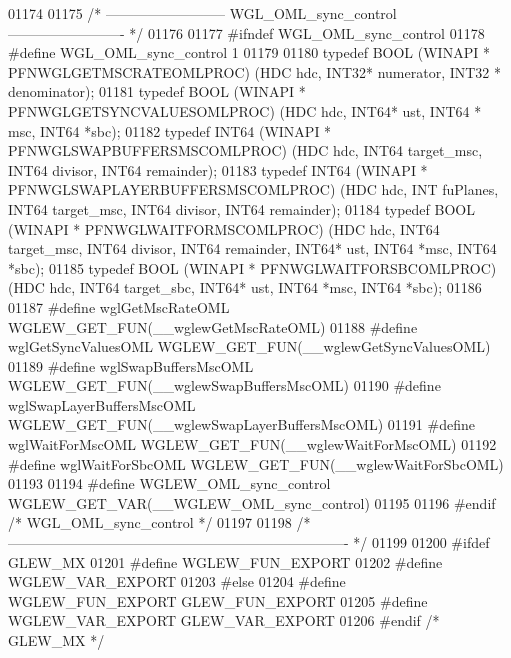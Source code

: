 \begin{DoxyCode}
01174 
01175 \textcolor{comment}{/* -------------------------- WGL\_OML\_sync\_control ------------------------- */}
01176 
01177 \textcolor{preprocessor}{#ifndef WGL\_OML\_sync\_control}
01178 \textcolor{preprocessor}{#define WGL\_OML\_sync\_control 1}
01179 
01180 \textcolor{keyword}{typedef} BOOL (WINAPI * PFNWGLGETMSCRATEOMLPROC) (HDC hdc, INT32* numerator, INT32 *
      denominator);
01181 \textcolor{keyword}{typedef} BOOL (WINAPI * PFNWGLGETSYNCVALUESOMLPROC) (HDC hdc, INT64* ust, INT64 *
      msc, INT64 *sbc);
01182 \textcolor{keyword}{typedef} INT64 (WINAPI * PFNWGLSWAPBUFFERSMSCOMLPROC) (HDC hdc, INT64 target_msc, 
      INT64 divisor, INT64 remainder);
01183 \textcolor{keyword}{typedef} INT64 (WINAPI * PFNWGLSWAPLAYERBUFFERSMSCOMLPROC) (HDC hdc, INT fuPlanes, 
      INT64 target_msc, INT64 divisor, INT64 remainder);
01184 \textcolor{keyword}{typedef} BOOL (WINAPI * PFNWGLWAITFORMSCOMLPROC) (HDC hdc, INT64 target_msc, 
      INT64 divisor, INT64 remainder, INT64* ust, INT64 *msc, INT64 *sbc);
01185 \textcolor{keyword}{typedef} BOOL (WINAPI * PFNWGLWAITFORSBCOMLPROC) (HDC hdc, INT64 target_sbc, 
      INT64* ust, INT64 *msc, INT64 *sbc);
01186 
01187 \textcolor{preprocessor}{#define wglGetMscRateOML WGLEW\_GET\_FUN(\_\_wglewGetMscRateOML)}
01188 \textcolor{preprocessor}{#define wglGetSyncValuesOML WGLEW\_GET\_FUN(\_\_wglewGetSyncValuesOML)}
01189 \textcolor{preprocessor}{#define wglSwapBuffersMscOML WGLEW\_GET\_FUN(\_\_wglewSwapBuffersMscOML)}
01190 \textcolor{preprocessor}{#define wglSwapLayerBuffersMscOML WGLEW\_GET\_FUN(\_\_wglewSwapLayerBuffersMscOML)}
01191 \textcolor{preprocessor}{#define wglWaitForMscOML WGLEW\_GET\_FUN(\_\_wglewWaitForMscOML)}
01192 \textcolor{preprocessor}{#define wglWaitForSbcOML WGLEW\_GET\_FUN(\_\_wglewWaitForSbcOML)}
01193 
01194 \textcolor{preprocessor}{#define WGLEW\_OML\_sync\_control WGLEW\_GET\_VAR(\_\_WGLEW\_OML\_sync\_control)}
01195 
01196 \textcolor{preprocessor}{#endif }\textcolor{comment}{/* WGL\_OML\_sync\_control */}\textcolor{preprocessor}{}
01197 
01198 \textcolor{comment}{/* ------------------------------------------------------------------------- */}
01199 
01200 \textcolor{preprocessor}{#ifdef GLEW\_MX}
01201 \textcolor{preprocessor}{#define WGLEW\_FUN\_EXPORT}
01202 \textcolor{preprocessor}{#define WGLEW\_VAR\_EXPORT}
01203 \textcolor{preprocessor}{#else}
01204 \textcolor{preprocessor}{#define WGLEW\_FUN\_EXPORT GLEW\_FUN\_EXPORT}
01205 \textcolor{preprocessor}{#define WGLEW\_VAR\_EXPORT GLEW\_VAR\_EXPORT}
01206 \textcolor{preprocessor}{#endif }\textcolor{comment}{/* GLEW\_MX */}\textcolor{preprocessor}{}

\end{DoxyCode}
